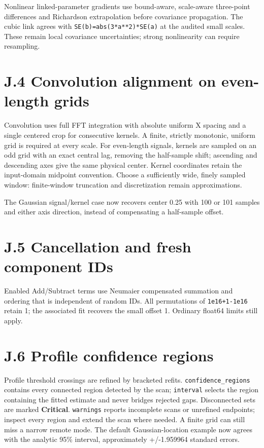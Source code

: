 \documentclass[
  10pt,
  a4paper,
  oneside]{scrreprt}
\begin{document}
Nonlinear linked-parameter gradients use bound-aware, scale-aware
three-point differences and Richardson extrapolation before covariance
propagation. The cubic link agrees with \texttt{SE(b)=abs(3*a**2)*SE(a)}
at the audited small scales. These remain local covariance
uncertainties; strong nonlinearity can require resampling.

\hypertarget{j.4-convolution-alignment-on-even-length-grids}{%
\section{J.4 Convolution alignment on even-length
grids}\label{j.4-convolution-alignment-on-even-length-grids}}

Convolution uses full FFT integration with absolute uniform X spacing
and a single centered crop for consecutive kernels. A finite, strictly
monotonic, uniform grid is required at every scale. For even-length
signals, kernels are sampled on an odd grid with an exact central lag,
removing the half-sample shift; ascending and descending axes give the
same physical center. Kernel coordinates retain the input-domain
midpoint convention. Choose a sufficiently wide, finely sampled window:
finite-window truncation and discretization remain approximations.

The Gaussian signal/kernel case now recovers center 0.25 with 100 or 101
samples and either axis direction, instead of compensating a half-sample
offset.

\hypertarget{j.5-cancellation-and-fresh-component-ids}{%
\section{J.5 Cancellation and fresh component
IDs}\label{j.5-cancellation-and-fresh-component-ids}}

Enabled Add/Subtract terms use Neumaier compensated summation and
ordering that is independent of random IDs. All permutations of
\texttt{1e16+1-1e16} retain 1; the associated fit recovers the small
offset 1. Ordinary float64 limits still apply.

\hypertarget{j.6-profile-confidence-regions}{%
\section{J.6 Profile confidence
regions}\label{j.6-profile-confidence-regions}}

Profile threshold crossings are refined by bracketed refits.
\texttt{confidence\_regions} contains every connected region detected by
the scan; \texttt{interval} selects the region containing the fitted
estimate and never bridges rejected gaps. Disconnected sets are marked
\textbf{Critical}. \texttt{warnings} reports incomplete scans or
unrefined endpoints; inspect every region and extend the scan where
needed. A finite grid can still miss a narrow remote mode. The default
Gaussian-location example now agrees with the analytic 95\% interval,
approximately +/-1.959964 standard errors.
\end{document}
